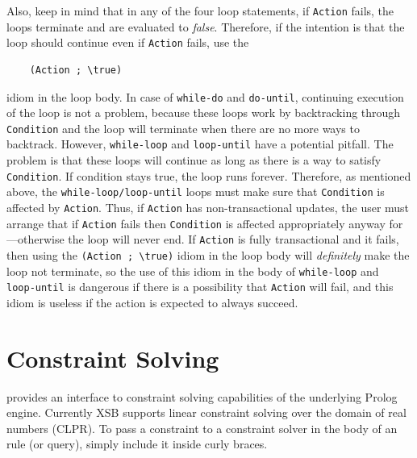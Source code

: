 \documentclass[11pt]{article}
\newcommand{\ERGO}{\mbox{\smaller{\ensuremath{\cal{E}}\smaller{{\sc{RGO}}}}}\xspace}
\newcommand{\FLSYSTEM}{\ERGO}
\newcommand{\bs}{\textbackslash}
\begin{document}
Also, keep in mind that in any of the four loop statements, if {\tt Action}
fails, the loops terminate and are evaluated to \emph{false}. Therefore,
if the intention is that the loop should continue even if {\tt Action}
fails, use the
\begin{verbatim}
    (Action ; \true)  
\end{verbatim}
idiom in the loop body. In case of {\tt while-do} and {\tt do-until},
continuing execution of the loop is not a problem, because these loops work
by backtracking through {\tt Condition} and the loop will terminate when
there are no more ways to backtrack. However, {\tt while-loop}
and {\tt loop-until}  have a potential pitfall. The problem is that
these loops will continue as long as there is a way to satisfy {\tt
  Condition}.  If condition stays true, the loop runs forever.
Therefore, as mentioned above, the \texttt{while-loop/loop-until}
loops must make sure that {\tt Condition}
is affected by {\tt Action}. Thus, if {\tt Action} has non-transactional updates,
the user must arrange that if {\tt Action} fails then {\tt Condition} is
affected appropriately anyway for---otherwise the loop will never end.
If {\tt Action} is fully transactional and it fails, then using the
{\tt (Action ; \bs{}true)} idiom in the loop body will \emph{definitely} make the loop
not terminate, so the use of this idiom in the body of {\tt while-loop} and {\tt
  loop-until} is dangerous if there is a possibility that {\tt Action} will
fail, and this idiom is useless if the action is expected to always succeed.



\section{Constraint Solving}\label{sec-clp}

\FLSYSTEM provides an interface to constraint solving capabilities of the
underlying Prolog engine. Currently XSB supports linear constraint solving
over the domain of real numbers (CLPR).
To pass a constraint to a constraint solver in the body of an \FLSYSTEM
rule (or query), simply include it inside curly braces.
\end{document}
